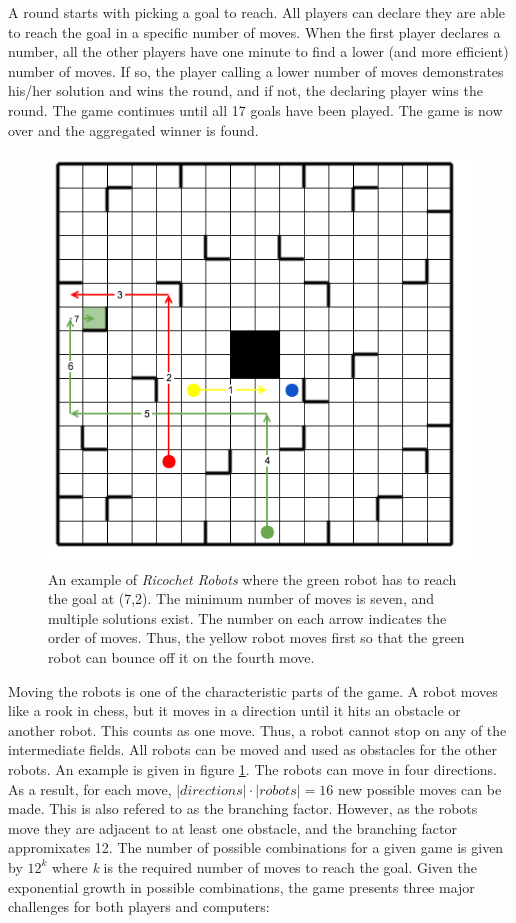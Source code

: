 \documentclass[]{article}
\begin{document}
A round starts with picking a goal to reach. All players can declare
they are able to reach the goal in a specific number of moves. When the
first player declares a number, all the other players have one minute to
find a lower (and more efficient) number of moves. If so, the player
calling a lower number of moves demonstrates his/her solution and wins
the round, and if not, the declaring player wins the round. The game
continues until all 17 goals have been played. The game is now over and
the aggregated winner is found.

\begin{figure}[htb]
\centering
\includegraphics[width=0.6\linewidth]{img/example.png}
\caption{An example of \emph{Ricochet Robots} where the green robot has to reach the goal at (7,2). The minimum number of moves is seven, and multiple solutions exist. The number on each arrow indicates the order of moves. Thus, the yellow robot moves first so that the green robot can bounce off it on the fourth move.}
\label{fig:example}
\end{figure}

Moving the robots is one of the characteristic parts of the game. A
robot moves like a rook in chess, but it moves in a direction until it
hits an obstacle or another robot. This counts as one move. Thus, a
robot cannot stop on any of the intermediate fields. All robots can be
moved and used as obstacles for the other robots. An example is given in
figure \ref{fig:example}. The robots can move in four directions. As a
result, for each move, \(|directions| \cdot |robots| = 16\) new possible
moves can be made. This is also refered to as the branching factor.
However, as the robots move they are adjacent to at least one obstacle,
and the branching factor appromixates 12. The number of possible
combinations for a given game is given by \(12^k\) where \emph{k} is the
required number of moves to reach the goal. Given the exponential growth
in possible combinations, the game presents three major challenges for
both players and computers:
\end{document}
